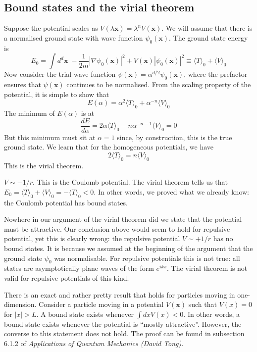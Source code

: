 \documentclass[cyan]{elegantnote}
\begin{document}
\subsection{Bound states and the virial theorem}
Suppose the potential scales as $V(\lambda \bm{x}) = \lambda^n V(\bm{x})$. We will assume that there is a normalised ground state with wave function $\psi_0(\bm{x})$.
The ground state energy is
\[E_0 = \int d^d\bm{x} \; -\frac{1}{2m}|\nabla\psi_0(\bm{x})|^2 + V(\bm{x})|\psi_0(\bm{x})|^2 \equiv \langle T \rangle_0 + \langle V \rangle_0\] 
Now consider the trial wave function $\psi(\bm{x}) = \alpha^{d/2} \psi_0(\bm{x})$, where the prefactor ensures
that $\psi(\bm{x})$ continues to be normalised. 
From the scaling property of the potential, it is simple to show that
\[E(\alpha) = \alpha^2 \langle T \rangle_0 + \alpha^{-n} \langle V \rangle_0\]
The minimum of $E(\alpha)$ is at
\[\frac{dE}{d\alpha} = 2\alpha\langle T \rangle_0 -n\alpha^{-n-1}\langle V \rangle_0 = 0\]
But this minimum must sit at $\alpha = 1$ since, by construction, this is the true ground state. We learn that for the homogeneous potentials, we have
\[2\langle T \rangle_0 = n\langle V \rangle_0\]
This is the virial theorem.
\begin{example}
$V \sim -1/r$. This is the Coulomb potential. The virial theorem tells us that $E_0 = \langle T \rangle_0 +  \langle V \rangle_0 = -\langle T \rangle_0 < 0$. In other words, we proved what we already know: the Coulomb potential has bound states.
\end{example}

\begin{note}
Nowhere in our argument of the virial theorem did we state that the potential must be attractive. Our conclusion above would seem to hold for repulsive potential, yet this is clearly wrong: the repulsive potential $V \sim +1/r$ has
no bound states. 
It is because we assumed at the beginning of the argument that the ground state $\psi_0$ was normalisable. For repulsive potentials this is not true: all states are asymptotically plane waves of the form $e^{ikx}$. 
The virial theorem is not valid for repulsive potentials of this kind.
\end{note}

\noindent
There is an exact and rather pretty result that holds for particles moving in one-dimension.
Consider a particle moving in a potential $V(\bm{x})$ such that $V(x) = 0$ for $|x| > L$. A bound state exists whenever $\int dx V(x) < 0$. In other words, a bound state exists whenever the potential is ``mostly attractive''. However, the converse to this statement does not hold. The proof can be found in subsection 6.1.2 of \emph{Applications of Quantum Mechanics (David Tong)}. 
\end{document}
